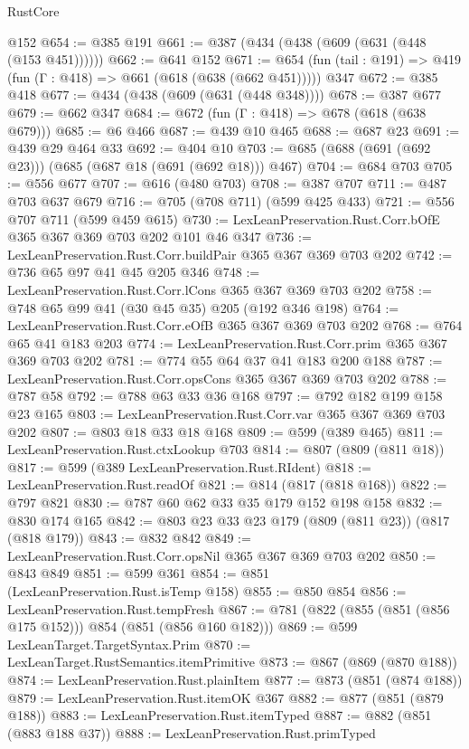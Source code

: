 \begin{lexlean}{RustCore}
\begin{coremodule}
    @152
@654 := @385 @191
@661 := @387 (@434 (@438 (@609 (@631 (@448 (@153 @451))))))
@662 := @641 @152
@671 := @654 (fun (tail : @191) => @419 (fun (Γ : @418) => @661 (@618 (@638 (@662 @451))))) @347
@672 := @385 @418
@677 := @434 (@438 (@609 (@631 (@448 @348))))
@678 := @387 @677
@679 := @662 @347
@684 := @672 (fun (Γ : @418) => @678 (@618 (@638 @679)))
@685 := @6 @466
@687 := @439 @10 @465
@688 := @687 @23
@691 := @439 @29 @464 @33
@692 := @404 @10
@703 := @685 (@688 (@691 (@692 @23))) (@685 (@687 @18 (@691 (@692 @18))) @467)
@704 := @684 @703
@705 := @556 @677
@707 := @616 (@480 @703)
@708 := @387 @707
@711 := @487 @703 @637 @679
@716 := @705 (@708 @711) (@599 @425 @433)
@721 := @556 @707 @711 (@599 @459 @615)
@730 := LexLeanPreservation.Rust.Corr.bOfE @365 @367 @369 @703 @202 @101 @46 @347
@736 := LexLeanPreservation.Rust.Corr.buildPair @365 @367 @369 @703 @202
@742 := @736 @65 @97 @41 @45 @205 @346
@748 := LexLeanPreservation.Rust.Corr.lCons @365 @367 @369 @703 @202
@758 := @748 @65 @99 @41 (@30 @45 @35) @205 (@192 @346 @198)
@764 := LexLeanPreservation.Rust.Corr.eOfB @365 @367 @369 @703 @202
@768 := @764 @65 @41 @183 @203
@774 := LexLeanPreservation.Rust.Corr.prim @365 @367 @369 @703 @202
@781 := @774 @55 @64 @37 @41 @183 @200 @188
@787 := LexLeanPreservation.Rust.Corr.opsCons @365 @367 @369 @703 @202
@788 := @787 @58
@792 := @788 @63 @33 @36 @168
@797 := @792 @182 @199 @158 @23 @165
@803 := LexLeanPreservation.Rust.Corr.var @365 @367 @369 @703 @202
@807 := @803 @18 @33 @18 @168
@809 := @599 (@389 @465)
@811 := LexLeanPreservation.Rust.ctxLookup @703
@814 := @807 (@809 (@811 @18))
@817 := @599 (@389 LexLeanPreservation.Rust.RIdent)
@818 := LexLeanPreservation.Rust.readOf
@821 := @814 (@817 (@818 @168))
@822 := @797 @821
@830 := @787 @60 @62 @33 @35 @179 @152 @198 @158
@832 := @830 @174 @165
@842 := @803 @23 @33 @23 @179 (@809 (@811 @23)) (@817 (@818 @179))
@843 := @832 @842
@849 := LexLeanPreservation.Rust.Corr.opsNil @365 @367 @369 @703 @202
@850 := @843 @849
@851 := @599 @361
@854 := @851 (LexLeanPreservation.Rust.isTemp @158)
@855 := @850 @854
@856 := LexLeanPreservation.Rust.tempFresh
@867 := @781 (@822 (@855 (@851 (@856 @175 @152))) @854 (@851 (@856 @160 @182)))
@869 := @599 LexLeanTarget.TargetSyntax.Prim
@870 := LexLeanTarget.RustSemantics.itemPrimitive
@873 := @867 (@869 (@870 @188))
@874 := LexLeanPreservation.Rust.plainItem
@877 := @873 (@851 (@874 @188))
@879 := LexLeanPreservation.Rust.itemOK @367
@882 := @877 (@851 (@879 @188))
@883 := LexLeanPreservation.Rust.itemTyped
@887 := @882 (@851 (@883 @188 @37))
@888 := LexLeanPreservation.Rust.primTyped

\end{coremodule}
\end{lexlean}
